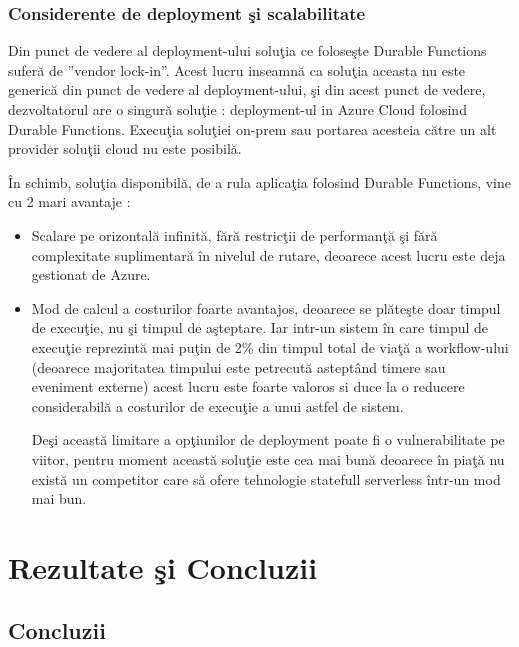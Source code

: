 \documentclass[a4paper,12pt]{report}
\begin{document}
\subsection{Considerente de deployment şi scalabilitate}
\quad Din punct de vedere al deployment-ului soluţia ce foloseşte Durable Functions suferă de ''vendor lock-in''. Acest lucru inseamnă ca soluţia aceasta nu este generică din punct de vedere al deployment-ului, şi din acest punct de vedere, dezvoltatorul are o singură soluţie : deployment-ul in Azure Cloud folosind Durable Functions. Execuţia soluţiei on-prem sau portarea acesteia către un alt provider soluţii cloud nu este posibilă. 
\par În schimb, soluţia disponibilă, de a rula aplicaţia folosind Durable Functions, vine cu 2 mari avantaje : 
\begin{itemize}
\item Scalare pe orizontală infinită, fără restricţii de performanţă şi fără complexitate suplimentară în nivelul de rutare, deoarece acest lucru este deja gestionat de Azure.
\item Mod de calcul a costurilor foarte avantajos, deoarece se plăteşte doar timpul de execuţie, nu şi timpul de aşteptare. Iar intr-un sistem în care timpul de execuţie reprezintă mai puţin de 2\% din timpul total de viaţă a workflow-ului (deoarece majoritatea timpului este petrecută asteptând timere sau eveniment externe) acest lucru este foarte valoros si duce la o reducere considerabilă a costurilor de execuţie a unui astfel de sistem. 
\par Deşi această limitare a opţiunilor de deployment poate fi o vulnerabilitate pe viitor, pentru moment această soluţie este cea mai bună deoarece în piaţă nu există un competitor care să ofere tehnologie statefull serverless într-un mod mai bun.  
\end{itemize}
\chapter {Rezultate şi Concluzii}

\section{Concluzii}


\listoffigures
\listoftables

\end{document}
